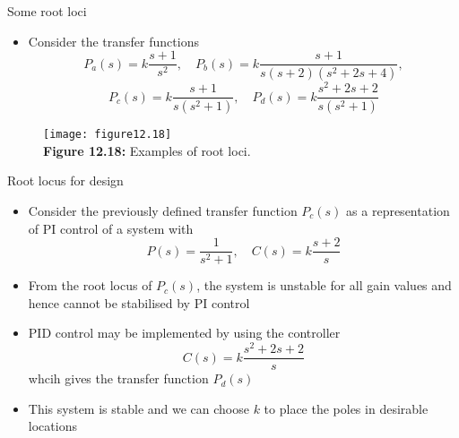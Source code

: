 \documentclass{beamer-control}
\begin{document}

\begin{frame}{Some root loci}
\begin{itemize}
\item Consider the transfer functions
\[P_a(s)=k\frac{s+1}{s^2}, \quad P_b(s) = k\frac{s+1}{s(s+2)(s^2+2s+4)},\]
\[P_c(s) = k\frac{s+1}{s(s^2+1)}, \quad P_d(s) = k\frac{s^2+2s+2}{s(s^2+1)}\]
\end{itemize}
\begin{figure}
	\centering
	\texttt{[image: figure12.18]}\\
	\vspace{-0.2cm}
	\textbf{Figure 12.18:} Examples of root loci.
\end{figure}
\end{frame}

\begin{frame}{Root locus for design}
\begin{itemize}
	\item Consider the previously defined transfer function $P_c(s)$ as a representation of PI control of a system with
	\[P(s)=\frac{1}{s^2+1}, \quad C(s)=k\frac{s+2}{s}\]
	\item From the root locus of $P_c(s)$, the system is unstable for all gain values and hence cannot be stabilised by PI control
	\item PID control may be implemented by using the controller
	\[C(s)=k\frac{s^2+2s+2}{s}\]
	whcih gives the transfer function $P_d(s)$
	\item This system is stable and we can choose $k$ to place the poles in desirable locations
\end{itemize}
\end{frame}

\SUMMARYFRAME
\FINALE
\end{document}
